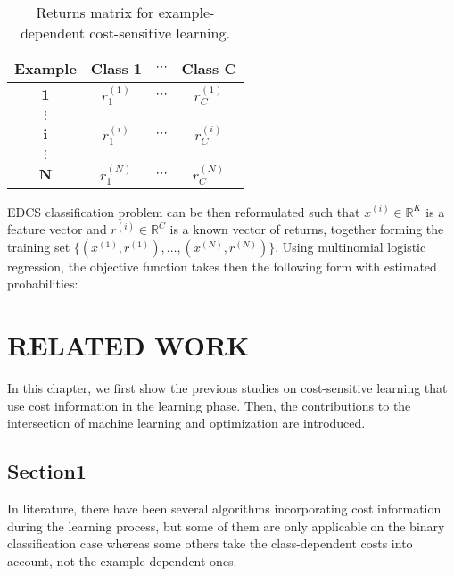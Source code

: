 \documentclass[a4paper,onesided,12pt]{report}
\newcommand{\R}{\mathbb{R}}
\begin{document}
\begin{table}[thbp]
    \caption{Returns matrix for example-dependent cost-sensitive learning.}
\begin{center}

    \begin{tabular}{|c|ccc|}\hline
        \textbf{Example}  & \textbf{Class 1} & $\cdots$ & \textbf{Class C}\\
      \hline
      $\textbf{1}$ &  $r^{(1)}_{1}$ & $\cdots$ & $r^{(1)}_{C}$  \\    
      $\vdots$ & & & \\
       $\textbf{i}$ &  $r^{(i)}_{1}$ & $\cdots$ & $r^{(i)}_{C}$  \\
             $\vdots$ & & & \\
       $\textbf{N}$ &  $r^{(N)}_{1}$ & $\cdots$ & $r^{(N)}_{C}$  \\\hline
    \end{tabular}
    \label{table:edcsmulticostmatrix}
\end{center}    
\end{table}  

\newpage
EDCS classification problem can be then reformulated such that $x^{(i)} \in \R^{K}$ is a feature vector and $r^{(i)} \in \R^{C}$ is a known vector of returns, together forming the training set $\{(x^{(1)},r^{(1)}), \dots, (x^{(N)},r^{(N)})\}$. Using multinomial logistic regression, the objective function takes then the following form with estimated probabilities:

\chapter{RELATED WORK}
\label{sec:literature}

In this chapter, we first show the previous studies on cost-sensitive learning that use cost information in the learning phase. Then, the contributions to the intersection of machine learning and optimization are introduced. 

\section{Section1}
\label{sec:Section1}

In literature, there have been several algorithms incorporating cost information during the learning process, but some of them are only applicable on the binary classification case whereas some others take the class-dependent costs into account, not the example-dependent ones.
\end{document}
